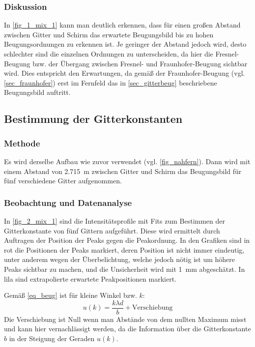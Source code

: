 \documentclass[
	a4paper,
	12pt,
	pagesize,
	ngerman
]{scrartcl}
\begin{document}
	\subsubsection*{Diskussion}
	In \cref{fig_1_mix_1} kann man deutlich erkennen, dass für einen großen Abstand zwischen Gitter und Schirm das erwartete Beugungsbild bis zu hohen Beugungsordnungen zu erkennen ist.
	Je geringer der Abstand jedoch wird, desto schlechter sind die einzelnen Ordnungen zu unterscheiden, da hier die Fresnel-Beugung bzw. der Übergang zwischen Fresnel- und Fraunhofer-Beugung sichtbar wird.
	Dies entspricht den Erwartungen, da gemäß der Fraunhofer-Beugung (vgl. \cref{sec_fraunhofer}) erst im Fernfeld das in \cref{sec_gitterbeug} beschriebene Beugungsbild auftritt.

	\subsection{Bestimmung der Gitterkonstanten} \label{ss_2_beug}

	\subsubsection*{Methode}

	Es wird derselbe Aufbau wie zuvor verwendet (vgl. \cref{fig_nahfern}).
	Dann wird mit einem Abstand von \SI{2,715}{m} zwischen Gitter und Schirm das Beugungsbild für fünf verschiedene Gitter aufgenommen.

	\subsubsection*{Beobachtung und Datenanalyse}
 In \cref{fig_2_mix_1} sind die Intensitätsprofile mit Fits zum Bestimmen der Gitterkonstante von fünf Gittern aufgeführt.
 Diese wird ermittelt durch Auftragen der Position der Peaks gegen die Peakordnung.
 In den Grafiken sind in rot die Positionen der Peaks markiert, deren Position ist nicht immer eindeutig, unter anderem wegen der Überbelichtung, welche jedoch nötig ist um höhere Peaks sichtbar zu machen, und die Unsicherheit wird mit \SI{1}{mm} abgeschätzt.
 In lila sind extrapolierte erwartete Peakpositionen markiert.

 Gemäß \cref{eq_beug} ist für kleine Winkel bzw. $k$:
 \begin{equation}
	 \label{eq_beug_verschieb}
	 u(k) = \frac{k\lambda d}{b} + \text{Verschiebung}
 \end{equation}
 Die Verschiebung ist Null wenn man Abstände von dem nullten Maximum misst und kann hier vernachlässigt werden, da die Information über die Gitterkonstante $b$ in der Steigung der Geraden $u(k)$.
\end{document}
